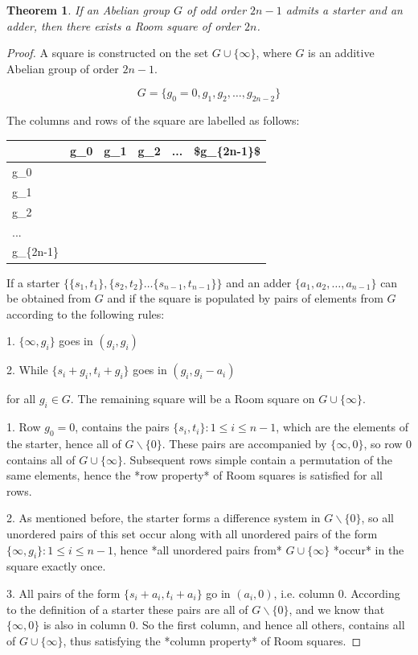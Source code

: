 \documentclass[
  11pt,
  a4paper]{book}
\newtheorem{theorem}{Theorem}
\begin{document}
\begin{theorem}
If an Abelian group $G$ of odd order $2n - 1$ admits a starter
and an adder, then there exists a Room square of order $2n$.
\end{theorem}

\begin{proof}
A square is constructed on the set $G \cup \{\infty\}$, where $G$ is an
additive Abelian group of order $2n-1$.

$$G = \{g_0 = 0, g_1, g_2, \ldots, g_{2n-2}\}$$

The columns and rows of the square are labelled as follows:


\begin{tabular}{l|l|l|l|l|l}
\hline
 & g\_0 & g\_1 & g\_2 & ... & \$g\_\{2n-1\}\$\\
\hline
g\_0 &  &  &  &  & \\
\hline
g\_1 &  &  &  &  & \\
\hline
g\_2 &  &  &  &  & \\
\hline
... &  &  &  &  & \\
\hline
g\_\{2n-1\} &  &  &  &  & \\
\hline
\end{tabular}

If a starter
$\{\{s_1, t_1\}, \{s_2, t_2\} \ldots \{s_{n - 1}, t_{n - 1}\}\}$
and an
adder $\{a_1, a_2, \ldots, a_{n - 1}\}$ can be obtained from
$G$ and if the square is populated by pairs of elements from
$G$ according to the following rules:

  1.  $\{\infty, g_i\}$ goes in $(g_i, g_i)$

  2.  While $\{s_i + g_i, t_i + g_i\}$ goes in $(g_i, g_i - a_i)$

for all $g_i \in G$. The remaining square will be a Room square on
$G \cup \{\infty\}$.

  1.  Row $g_0 = 0$, contains the pairs
      $\{s_i, t_i\}:1 \leq i \leq n-1$,
      which are the elements of the starter,
      hence all of $G \backslash \{0\}$. These pairs are
      accompanied by $\{\infty, 0\}$, so row 0 contains all
      of $G \cup \{\infty\}$. Subsequent rows simple
      contain a permutation of the same elements, hence
      the *row property* of Room squares is satisfied for
      all rows.

  2.  As mentioned before, the starter forms a difference
      system in $G \backslash \{0\}$, so all unordered
      pairs of this set occur along with all unordered
      pairs of the form
      $\{\infty, g_i\}: 1 \leq i \leq n - 1$,
      hence *all unordered pairs from*
      $G \cup \{\infty\}$ *occur* in the square exactly once.

  3.  All pairs of the form $\{s_i + a_i, t_i + a_i\}$ go in
      $(a_i, 0)$, i.e. column 0. According to the
      definition of a starter these pairs are all of $G
      \backslash \{0\}$, and we know that $\{\infty,0\}$
      is also in column 0. So the first column, and hence
      all others, contains all of $G \cup \{\infty\}$,
      thus satisfying the *column property* of Room
      squares.
\end{proof}
\end{document}
